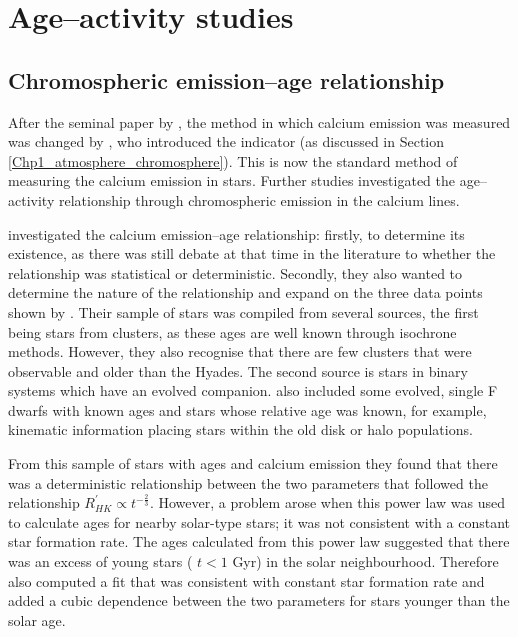 \section{Age--activity studies}
\label{Chp2_section_activity_age}
\subsection{Chromospheric emission--age relationship}

After the seminal paper by \citet{Skumanich_1972}, the method in which calcium emission was measured was changed by \citet{Noyes_etal_1984}, who introduced the \Rprime indicator (as discussed in Section \ref{Chp1_atmosphere_chromosphere}). This is now the standard method of measuring the calcium emission in stars. Further studies investigated the age--activity relationship through chromospheric emission in the calcium lines.

\citet{Soderblom_etal_1991} investigated the calcium emission--age relationship: firstly, to determine its existence, as there was still debate at that time in the literature to whether the relationship was statistical or deterministic. Secondly, they also wanted to determine the nature of the relationship and expand on the three data points shown by \citet{Skumanich_1972}. Their sample of stars was compiled from several sources, the first being stars from clusters, as these ages are well known through isochrone methods. However, they also recognise that there are few clusters that were observable and older than the Hyades. The second source is stars in binary systems which have an evolved companion. \citet{Soderblom_etal_1991} also included some evolved, single F dwarfs with known ages and stars whose relative age was known, for example, kinematic information placing stars within the old disk or halo populations.

From this sample of stars with ages and calcium emission they found that there was a deterministic relationship between the two parameters that followed the relationship $R^{'}_{HK} \propto t^{-\frac{2}{3}}$. However, a problem arose when this power law was used to calculate ages for nearby solar-type stars; it was not consistent with a constant star formation rate. The ages calculated from this power law suggested that there was an excess of young stars ( $t < 1$ Gyr) in the solar neighbourhood. Therefore \citet{Soderblom_etal_1991} also computed a fit that was consistent with constant star formation rate and added a cubic dependence between the two parameters for stars younger than the solar age.

